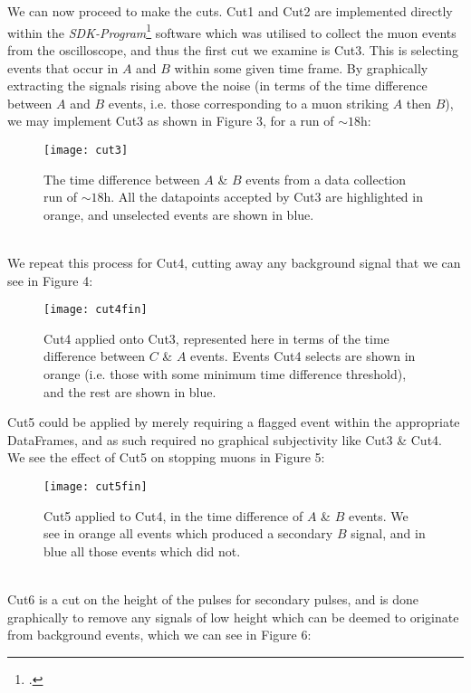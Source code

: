 \documentclass[a4paper]{article}
\begin{document}
\\\\
We can now proceed to make the cuts.
Cut1 and Cut2 are implemented directly within the \textit{SDK-Program}\footcite{script} software which was utilised to collect the muon events from the oscilloscope, and thus the first cut we examine is Cut3.
This is selecting events that occur in $A$ and $B$ within some given time frame.
By graphically extracting the signals rising above the noise (in terms of the time difference between $A$ and $B$ events, i.e. those corresponding to a muon striking $A$ then $B$), we may implement Cut3 as shown in Figure 3, for a run of $\sim18$h:
\newpage \noindent
\begin{figure}[h!]
\begin{center}
	\texttt{[image: cut3]}
\end{center}
\caption{The time difference between $A$ \& $B$ events from a data collection run of $\sim 18$h. All the datapoints accepted by Cut3 are highlighted in orange, and unselected events are shown in blue.}
\end{figure}
\\
We repeat this process for Cut4, cutting away any background signal that we can see in Figure 4:
\begin{figure}[h!]
\begin{center}
	\texttt{[image: cut4fin]}
\end{center}
\caption{Cut4 applied onto Cut3, represented here in terms of the time difference between $C$ \& $A$ events. Events Cut4 selects are shown in orange (i.e. those with some minimum time difference threshold), and the rest are shown in blue.}
\end{figure}
\newpage \noindent
Cut5 could be applied by merely requiring a flagged event within the appropriate DataFrames, and as such required no graphical subjectivity like Cut3 \& Cut4. We see the effect of Cut5 on stopping muons in Figure 5:
\begin{figure}[h!]
\begin{center}
	\texttt{[image: cut5fin]}
\end{center}
\caption{Cut5 applied to Cut4, in the time difference of $A$ \& $B$ events. We see in orange all events which produced a secondary $B$ signal, and in blue all those events which did not.}
\end{figure}
\\
Cut6 is a cut on the height of the pulses for secondary pulses, and is done graphically to remove any signals of low height which can be deemed to originate from background events, which we can see in Figure 6:
\end{document}
